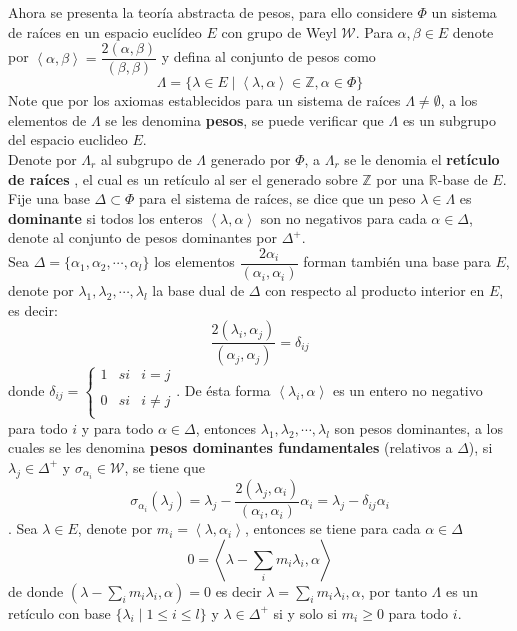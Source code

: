\documentclass[11pt,a4paper]{article}
\newcommand{\suchthat}{\mid}
\begin{document}
Ahora se presenta la teoría abstracta de pesos, para ello considere $\Phi$ un sistema de raíces en un espacio euclídeo $E$ con grupo de Weyl $\mathcal{W}$.   Para $\alpha, \beta \in  E$ denote por $\left \langle  \alpha, \beta\right \rangle= \displaystyle \dfrac{2(\alpha, \beta)}{(\beta, \beta)} $ y defina al conjunto de pesos  como 
$$\Lambda= \{ \lambda \in E \suchthat \left\langle \lambda, \alpha \right \rangle \in \mathbb{Z}, \alpha \in \Phi\}$$
Note que por los axiomas establecidos para un sistema de raíces $\Lambda\neq \emptyset$, a los elementos de $\Lambda$ se les denomina \textbf{pesos}, se puede verificar que $\Lambda$ es un subgrupo del espacio euclideo $E$. \\
Denote por $\Lambda_r$ al subgrupo de $\Lambda$  generado por $\Phi$, a $\Lambda_r$ se le denomia el \textbf{retículo de raíces }, el cual es un retículo al ser el generado sobre $\mathbb{Z}$ por una $\mathbb{R}$-base de $E$.\\

Fije una base $\Delta \subset \Phi$ para el sistema de raíces, se dice que un peso $\lambda \in  \Lambda$ es \textbf{dominante} si todos los enteros $\left\langle \lambda, \alpha \right\rangle$ son no negativos para cada $\alpha \in \Delta$, denote al conjunto de pesos dominantes por $\Delta^+$. \\
Sea $\Delta= \{\alpha_1, \alpha_2, \cdots, \alpha_l \}$ los elementos $\dfrac{2\alpha_i}{(\alpha_i, \alpha_i)}$ forman también una base para $E$, denote por $\lambda_1,\lambda_2, \cdots, \lambda_l$ la base dual de $\Delta$ con respecto  al producto interior en $E$, es decir:
$$\dfrac{2(\lambda_i,\alpha_j)}{(\alpha_j, \alpha_j)}= \delta_{ij} $$
donde $\delta_{ij}=\left\{ \begin{array}{lcc}
             1 &   si  & i= j \\
             \\ 0 &  si & i\neq j \\
             \end{array}
   \right.$.
   De ésta forma $\left\langle \lambda_i, \alpha \right\rangle$  es un entero no negativo para todo $i$ y para todo $\alpha \in \Delta$, entonces $\lambda_1, \lambda_2, \cdots, \lambda_l$ son pesos dominantes, a los cuales se les denomina \textbf{pesos dominantes fundamentales} (relativos a $\Delta$), si $\lambda_j \in \Delta^+$ y $\sigma_{\alpha_i} \in \mathcal{W}$, se tiene que \\
   $$\sigma_{\alpha_i}(\lambda_j)= \lambda_j - \dfrac{2(\lambda_j, \alpha_i)}{(\alpha_i, \alpha_i)}\alpha_i= \lambda_j - \delta_{ij} \alpha_i$$.
   Sea $\lambda\in E$, denote por $m_i= \left \langle  \lambda, \alpha_i \right \rangle$, entonces se tiene para cada $\alpha\in \Delta$
   $$0 = \left \langle \lambda- \sum_{i}m_i \lambda_i, \alpha \right\rangle$$
   de donde $(\lambda-\sum_{i}m_i \lambda_i, \alpha)=0$ es decir $\lambda= \sum_{i}m_i \lambda_i, \alpha$, por tanto $\Lambda$ es un retículo con base $\{\lambda_i \suchthat 1\leq i \leq l\}$ y $\lambda \in \Delta^+$ si y solo si $m_i \geq 0$ para todo $i$.\\
   
\end{document}
